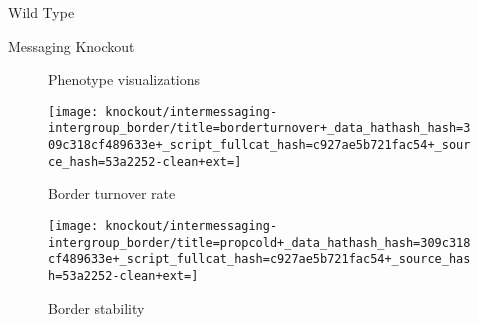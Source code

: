 \begin{figure*}[!htbp]
\begin{center}
\begin{minipage}[t]{\columnwidth}
\vspace{1.0ex}

\hspace*{\fill}%
\begin{minipage}[t]{0.05\columnwidth}
\vspace{0pt} %
\end{minipage}%
\hfill
\begin{minipage}[t]{0.45\columnwidth}
\centering
\vspace{0pt} %
Wild Type
\end{minipage}%
\hfill
\begin{minipage}[t]{0.45\columnwidth}
\centering
\vspace{0pt} %
Messaging Knockout
\end{minipage}%
\hspace*{\fill}

\vspace{1.0ex}

\begin{subfigure}{\columnwidth}
  \caption{Phenotype visualizations}
\end{subfigure}

\end{minipage}%
\begin{minipage}[t]{\columnwidth}

\hspace*{\fill}%
\begin{minipage}[t]{\columnwidth}
\centering
\vspace{0pt} %
\begin{subfigure}[b]{\textwidth}
\texttt{[image: knockout/intermessaging-intergroup\_border/title=borderturnover+\_data\_hathash\_hash=309c318cf489633e+\_script\_fullcat\_hash=c927ae5b721fac54+\_source\_hash=53a2252-clean+ext=]}%
\caption{Border turnover rate}
\label{fig:TODO}
\end{subfigure}
\end{minipage}%
\hspace*{\fill}

\vspace{1ex}

\hspace*{\fill}%
\begin{minipage}[t]{\columnwidth}
\centering
\vspace{0pt} %
\begin{subfigure}[b]{\textwidth}
\texttt{[image: knockout/intermessaging-intergroup\_border/title=propcold+\_data\_hathash\_hash=309c318cf489633e+\_script\_fullcat\_hash=c927ae5b721fac54+\_source\_hash=53a2252-clean+ext=]}%
\caption{Border stability}
\label{fig:TODO}
\end{subfigure}
\end{minipage}%
\hspace*{\fill}


\end{minipage}
\end{center}
\end{figure*}
